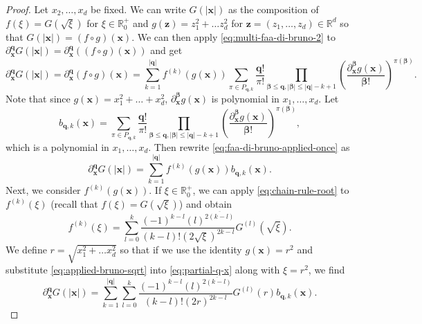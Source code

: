 \documentclass[12pt]{article}
\def\R{{\mathbb R}}
\let\b=\boldsymbol
\def\risingfac#1#2{\left(#1\right)^{\overline{#2}}}
\theoremstyle{definition}
\theoremstyle{plain}
\theoremstyle{definition}
\begin{document}
\begin{proof}
Let $x_2,\dots,x_d$ be fixed.
We can write $G(|\b{x}|)$ as the composition of $f(\xi) = G( \sqrt{\xi})$ for $\xi \in \R^{+}_0$ and $g(\b{z}) = z_1^2 + \dots z_d^2$ for $\b{z} = (z_1, \dots, z_d) \in \R^d$ so that $G(|\b{x}|) = (f \circ g)(\b{x})$. We can then apply \eqref{eq:multi-faa-di-bruno-2} to $\partial^{\b{q}}_{\b{x}} G(|\b{x}|) = \partial^{\b{q}}_{\b{x}} \left((f\circ g)(\b{x}) \right)$ and get
\begin{equation}
\label{eq:faa-di-bruno-applied-once}
\partial^{\b{q}}_{\b{x}} G(|\b{x}|) = \partial^{\b{q}}_{\b{x}} (f\circ g)(\b{x})  = \sum_{k=1}^{|\b{q}|} f^{(k)}(g(\b{x})) \sum_{\pi \in P_{\b{q},k}} \frac{\b{q}!}{\pi!} \prod_{\b{\beta} \leq \b{q}, |\b{\beta}| \leq |\b{q}|-k+1} \left( \frac{\partial^{\b{\beta}}_{\b{x}} g(\b{x})}{\b{\beta}!} \right)^{\pi(\b{\beta})}.
\end{equation}
Note that since $g(\b{x}) = x_1^2 + \dots + x_d^2$, $\partial^{\b{\beta}}_{\b{x}} g(\b{x})$ is polynomial in $x_1, \dots, x_d$.
Let
\begin{equation}
\label{eq:bqk-def}
b_{\b{q},k}(\b{x}) = \sum_{\pi \in P_{\b{q},k}} \frac{\b{q}!}{\pi!} \prod_{\b{\beta} \leq \b{q}, |\b{\beta}| \leq |\b{q}|-k+1} \left( \frac{\partial^{\b{\beta}}_{\b{x}} g(\b{x})}{\b{\beta}!} \right)^{\pi(\b{\beta})},
\end{equation}
which is a polynomial in $x_1, \dots, x_d$.
Then rewrite \eqref{eq:faa-di-bruno-applied-once} as
\begin{equation}
\label{eq:partial-q-x}
\partial^{\b{q}}_{\b{x}} G(|\b{x}|) = \sum_{k=1}^{|\b{q}|} f^{(k)}(g(\b{x})) b_{\b{q},k}(\b{x}).
\end{equation}
Next, we consider $f^{(k)}(g(\b{x}))$. If $\xi \in \R^{+}_0$, we can apply \eqref{eq:chain-rule-root} to $f^{(k)}(\xi)$ (recall that $f(\xi)= G(\sqrt{\xi})$) and obtain
\begin{equation}
\label{eq:applied-bruno-sqrt}
f^{(k)}(\xi) = \sum_{l=0}^k \frac{(-1)^{k-l}\risingfac{l}{2(k-l)}}{(k-l)!(2 \sqrt{\xi})^{2k-l}} G^{(l)}(\sqrt{\xi}).
\end{equation}
We define $r =\sqrt{ x_1^2 + \dots x_d^2}$ so that if we use the identity $g(\b{x}) = r^2$ and substitute \eqref{eq:applied-bruno-sqrt} into \eqref{eq:partial-q-x} along with $\xi = r^2$, we find
\begin{equation}
\label{eq:partialqxbulky}
\partial^{\b{q}}_{\b{x}} G(|\b{x}|) =\sum_{k=1}^{|\b{q}|} \sum_{l=0}^k \frac{(-1)^{k-l}\risingfac{l}{2(k-l)}}{(k-l)!(2 r)^{2k-l}} G^{(l)}(r) b_{\b{q},k}(\b{x}) .

\end{equation}
\end{proof}
\end{document}
